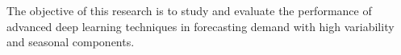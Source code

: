 The objective of this research is to study and evaluate the performance of advanced deep learning techniques in forecasting demand with high variability and seasonal components.
